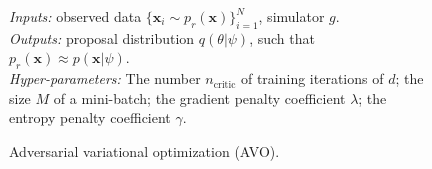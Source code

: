 \documentclass[twocolumn,superscriptaddress,aps]{revtex4-1}
\theoremstyle{plain}
\begin{document}
\begin{figure}
    \begin{minipage}{\linewidth}
    \begin{algorithm}[H]
    \caption{Adversarial variational optimization (AVO).}

    \begin{flushleft}
        {\it Inputs:} observed data $\{ \mathbf{x}_i \sim p_r(\mathbf{x}) \}_{i=1}^N$, simulator $g$.\\
        {\it Outputs:} proposal distribution $q(\theta|\psi)$, such that $p_r(\mathbf{x}) \approx p(\mathbf{x}|\psi)$.\\
        {\it Hyper-parameters:} The number $n_{\text{critic}}$ of training iterations of $d$; the size $M$ of a mini-batch; the gradient penalty coefficient $\lambda$; the entropy penalty coefficient $\gamma$.
    \end{flushleft}

    \label{alg:avo}
    \begin{algorithmic}[1]
             
                \EndFor
            \EndFor
              
        \EndWhile
    \end{algorithmic}
    \end{algorithm}
    \end{minipage}
\end{figure}
\end{document}
